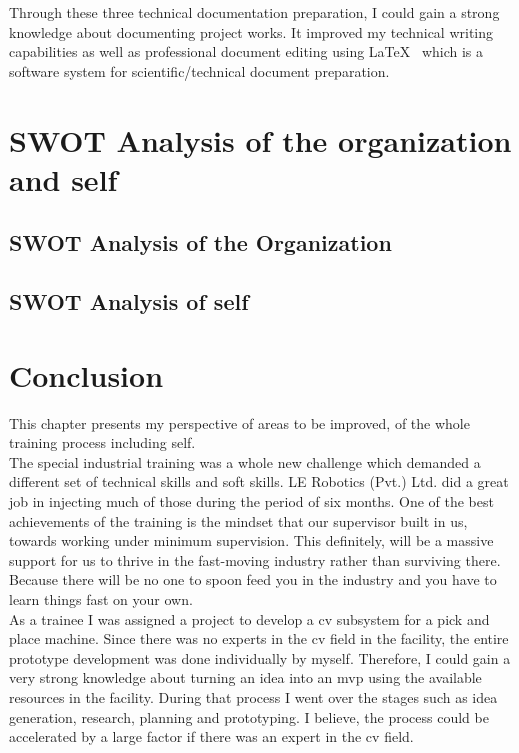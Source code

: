\documentclass[a4paper,12pt]{report}%
\begin{document}
Through these three technical documentation preparation, I could gain a strong knowledge about documenting project works. It improved my technical writing capabilities as well as professional document editing using \LaTeX ~ which is a software system for scientific/technical document preparation.



\chapter{SWOT Analysis of the organization and self}

\section{SWOT Analysis of the Organization}



\section{SWOT Analysis of self}

\chapter{Conclusion}

This chapter presents my perspective of areas to be improved, of the whole training process including self.\\

The special industrial training was a whole new challenge which demanded a different set of technical skills and soft skills. LE Robotics (Pvt.) Ltd. did a great job in injecting much of those during the period of six months. One of the best achievements of the training is the mindset that our supervisor built in us, towards working under minimum supervision. This definitely, will be a massive support for us to thrive in the fast-moving industry rather than surviving there. Because there will be no one to spoon feed you in the industry and you have to learn things fast on your own.\\

As a trainee I was assigned a project to develop a \ac{cv} subsystem for a pick and place machine. Since there was no experts in the \ac{cv} field in the facility, the entire prototype development was done individually by myself. Therefore, I could gain a very strong knowledge about turning an idea into an \ac{mvp} using the available resources in the facility. During that process I went over the stages such as idea generation, research, planning and prototyping. I believe, the process could be accelerated by a large factor if there was an expert in the \ac{cv} field. 
\end{document}
